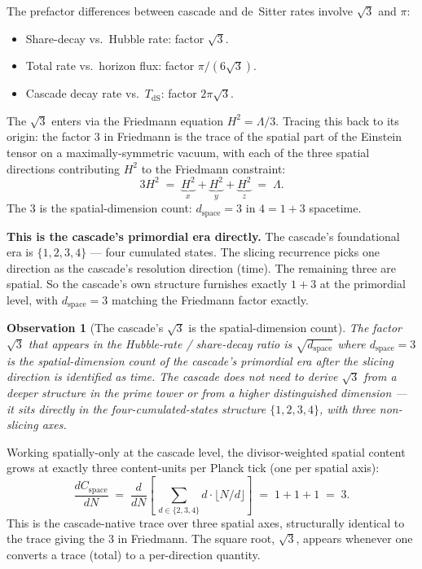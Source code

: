\documentclass[11pt,a4paper]{article}
\newtheorem{observation}[theorem]{Observation}
\begin{document}
The prefactor differences between cascade and de~Sitter rates
involve $\sqrt{3}$ and $\pi$:
\begin{itemize}
\item Share-decay vs.\ Hubble rate: factor $\sqrt{3}$.
\item Total rate vs.\ horizon flux: factor $\pi/(6\sqrt{3})$.
\item Cascade decay rate vs.\ $T_{\mathrm{dS}}$: factor
$2\pi\sqrt{3}$.
\end{itemize}
The $\sqrt{3}$ enters via the Friedmann equation
$H^2 = \Lambda/3$. Tracing this back to its origin: the factor $3$
in Friedmann is the trace of the spatial part of the Einstein
tensor on a maximally-symmetric vacuum, with each of the three
spatial directions contributing $H^2$ to the Friedmann constraint:
\[
3 H^2 \;=\; \underbrace{H^2}_{x} + \underbrace{H^2}_{y} + \underbrace{H^2}_{z} \;=\; \Lambda.
\]
The $3$ is the spatial-dimension count: $d_{\mathrm{space}} = 3$ in
$4 = 1 + 3$ spacetime.

\textbf{This is the cascade's primordial era directly.} The cascade's
foundational era is $\{1, 2, 3, 4\}$ --- four cumulated states. The
slicing recurrence picks one direction as the cascade's resolution
direction (time). The remaining three are spatial. So the cascade's
own structure furnishes exactly $1 + 3$ at the primordial level, with
$d_{\mathrm{space}} = 3$ matching the Friedmann factor exactly.

\begin{observation}[The cascade's $\sqrt{3}$ is the spatial-dimension count]\label{obs:sqrt3-spatial}
The factor $\sqrt{3}$ that appears in the Hubble-rate / share-decay
ratio is $\sqrt{d_{\mathrm{space}}}$ where $d_{\mathrm{space}} = 3$
is the spatial-dimension count of the cascade's primordial era after
the slicing direction is identified as time. The cascade does not
need to derive $\sqrt{3}$ from a deeper structure in the prime tower
or from a higher distinguished dimension --- it sits directly in
the four-cumulated-states structure $\{1, 2, 3, 4\}$, with three
non-slicing axes.
\end{observation}

Working spatially-only at the cascade level, the divisor-weighted
spatial content grows at exactly three content-units per Planck tick
(one per spatial axis):
\[
\frac{dC_{\mathrm{space}}}{dN} \;=\; \frac{d}{dN}\!\!\left[\,\sum_{d \in \{2,3,4\}} d \cdot \lfloor N/d \rfloor\right] \;=\; 1 + 1 + 1 \;=\; 3.
\]
This is the cascade-native trace over three spatial axes, structurally
identical to the trace giving the $3$ in Friedmann. The square root,
$\sqrt{3}$, appears whenever one converts a trace (total) to a
per-direction quantity.
\end{document}
